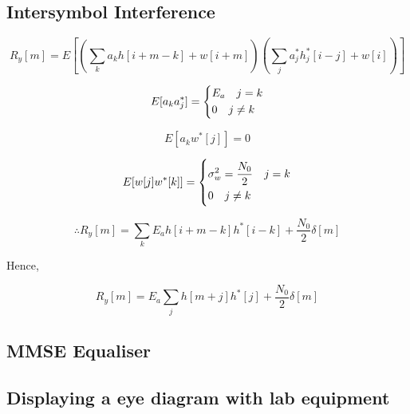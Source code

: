 \subsection{Intersymbol Interference}

\begin{equation}
    \label{eqn:expl-0}
    R_y[m] = E[(\sum_{k}a_kh[i+m-k]+w[i+m])(\sum_j a_j^* h_j^*[i-j]+w[i])]
\end{equation}

\begin{equation}
    \label{eqn:expl-1}
    E[a_k a_j^*] =
    \begin{dcases}
        E_a \quad j=k \\
        0 \quad j \neq k
    \end{dcases}
\end{equation}

\begin{equation}
    \label{eqn:expl-2}
    E[a_k w^*[j]] = 0
\end{equation}

\begin{equation}
    \label{eqn:expl-3}
    E[w[j]w^*[k]] =
    \begin{dcases}
        \sigma_w^2 = \frac{N_0}{2} \quad j=k \\
        0 \quad j \neq k
    \end{dcases}
\end{equation}

\begin{equation}
    \label{eqn:expl-4}
    \therefore R_y[m] = \sum_k E_a h[i+m-k]h^*[i-k]+ \frac{N_0}{2}\delta [m]
\end{equation}

Hence,

\begin{equation}
    \label{eqn:expl-5}
    R_y[m] = E_a \sum_j h[m+j]h^*[j] + \frac{N_0}{2} \delta [m]
\end{equation}

\subsection{MMSE Equaliser}

\subsection{Displaying a eye diagram with lab equipment}
